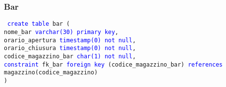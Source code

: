 \documentclass{article}
\begin{document}
    \subsubsection{Bar}
    \begin{flushleft}
        \texttt{
        \textcolor{blue}{create table} bar ( \\
        \hspace*{2em} nome\_bar \hspace*{5.8em} \textcolor{blue}{varchar(30)} \hspace*{3.2em} \textcolor{blue}{primary key}, \\
        \hspace*{2em} orario\_apertura \hspace*{2.2em} \textcolor{blue}{timestamp(0)} \hspace*{3em} \textcolor{blue}{not null}, \\
        \hspace*{2em} orario\_chiusura \hspace*{2.2em} \textcolor{blue}{timestamp(0)} \hspace*{3em} \textcolor{blue}{not null}, \\
        \hspace*{2em} codice\_magazzino\_bar \hspace*{0.02em} \textcolor{blue}{char(1)} \hspace*{5.3em} \textcolor{blue}{not null}, \\
        \hspace*{2em} \textcolor{blue}{constraint} fk\_bar \textcolor{blue}{foreign key} (codice\_magazzino\_bar) \textcolor{blue}{references} \hspace*{2em} magazzino(codice\_magazzino) \\)}
    \end{flushleft}
\end{document}
